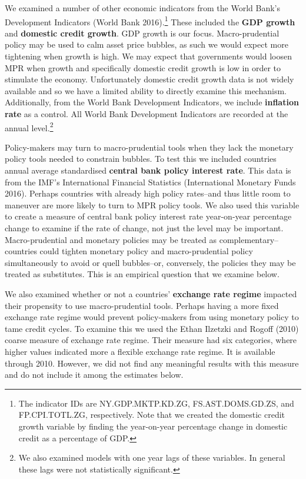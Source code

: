 \documentclass[]{article}
\let\rmarkdownfootnote\footnote%
\def\footnote{\protect\rmarkdownfootnote}
\begin{document}
We examined a number of other economic indicators from the World Bank's
Development Indicators (World Bank 2016).\footnote{The indicator IDs are
  NY.GDP.MKTP.KD.ZG, FS.AST.DOMS.GD.ZS, and FP.CPI.TOTL.ZG,
  respectively. Note that we created the domestic credit growth variable
  by finding the year-on-year percentage change in domestic credit as a
  percentage of GDP.} These included the \textbf{GDP growth} and
\textbf{domestic credit growth}. GDP growth is our focus.
Macro-prudential policy may be used to calm asset price bubbles, as such
we would expect more tightening when growth is high. We may expect that
governments would loosen MPR when growth and specifically domestic
credit growth is low in order to stimulate the economy. Unfortunately
domestic credit growth data is not widely available and so we have a
limited ability to directly examine this mechanism. Additionally, from
the World Bank Development Indicators, we include \textbf{inflation
rate} as a control. All World Bank Development Indicators are recorded
at the annual level.\footnote{We also examined models with one year lags
  of these variables. In general these lags were not statistically
  significant.}

Policy-makers may turn to macro-prudential tools when they lack the
monetary policy tools needed to constrain bubbles. To test this we
included countries annual average standardised \textbf{central bank
policy interest rate}. This data is from the IMF's International
Financial Statistics (International Monetary Funds 2016). Perhaps
countries with already high policy rates--and thus little room to
maneuver are more likely to turn to MPR policy tools. We also used this
variable to create a measure of central bank policy interest rate
year-on-year percentage change to examine if the rate of change, not
just the level may be important. Macro-prudential and monetary policies
may be treated as complementary--countries could tighten monetary policy
and macro-prudential policy simultaneously to avoid or quell
bubbles--or, conversely, the policies they may be treated as
substitutes. This is an empirical question that we examine below.

We also examined whether or not a countries' \textbf{exchange rate
regime} impacted their propensity to use macro-prudential tools. Perhaps
having a more fixed exchange rate regime would prevent policy-makers
from using monetary policy to tame credit cycles. To examine this we
used the Ethan Ilzetzki and Rogoff (2010) coarse measure of exchange
rate regime. Their measure had six categories, where higher values
indicated more a flexible exchange rate regime. It is available through
2010. However, we did not find any meaningful results with this measure
and do not include it among the estimates below.
\end{document}

